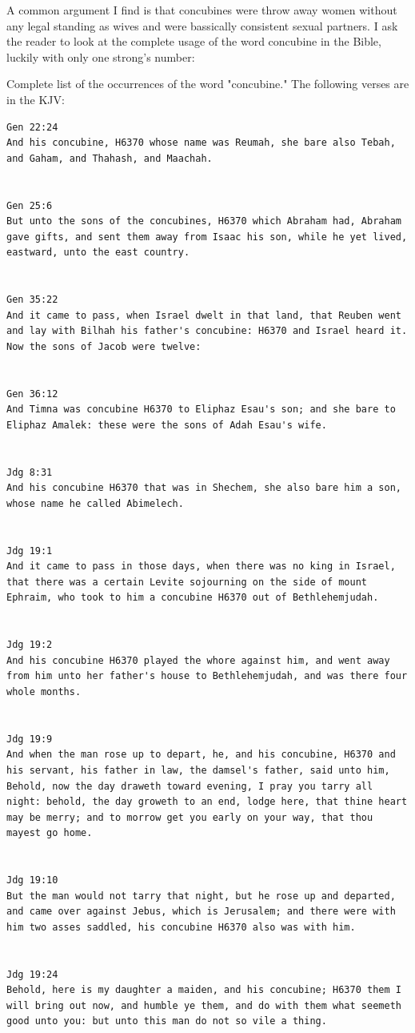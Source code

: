 \documentclass[11pt]{article}
\begin{document}
A common argument I find is that concubines were throw away women without any legal standing as wives and were bassically consistent sexual partners. I ask the reader to look at the complete usage of the word concubine in the Bible, luckily with only one strong's number:

Complete list of the occurrences of the word "concubine." The following verses are in the KJV:

\begin{lstlisting}
Gen 22:24
And his concubine, H6370 whose name was Reumah, she bare also Tebah, and Gaham, and Thahash, and Maachah.


Gen 25:6
But unto the sons of the concubines, H6370 which Abraham had, Abraham gave gifts, and sent them away from Isaac his son, while he yet lived, eastward, unto the east country.


Gen 35:22
And it came to pass, when Israel dwelt in that land, that Reuben went and lay with Bilhah his father's concubine: H6370 and Israel heard it. Now the sons of Jacob were twelve:


Gen 36:12
And Timna was concubine H6370 to Eliphaz Esau's son; and she bare to Eliphaz Amalek: these were the sons of Adah Esau's wife.


Jdg 8:31
And his concubine H6370 that was in Shechem, she also bare him a son, whose name he called Abimelech.


Jdg 19:1
And it came to pass in those days, when there was no king in Israel, that there was a certain Levite sojourning on the side of mount Ephraim, who took to him a concubine H6370 out of Bethlehemjudah.


Jdg 19:2
And his concubine H6370 played the whore against him, and went away from him unto her father's house to Bethlehemjudah, and was there four whole months.


Jdg 19:9
And when the man rose up to depart, he, and his concubine, H6370 and his servant, his father in law, the damsel's father, said unto him, Behold, now the day draweth toward evening, I pray you tarry all night: behold, the day groweth to an end, lodge here, that thine heart may be merry; and to morrow get you early on your way, that thou mayest go home.


Jdg 19:10
But the man would not tarry that night, but he rose up and departed, and came over against Jebus, which is Jerusalem; and there were with him two asses saddled, his concubine H6370 also was with him.


Jdg 19:24
Behold, here is my daughter a maiden, and his concubine; H6370 them I will bring out now, and humble ye them, and do with them what seemeth good unto you: but unto this man do not so vile a thing.



\end{lstlisting}
\end{document}
